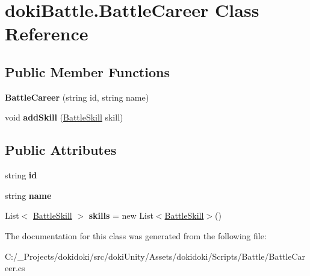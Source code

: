 \hypertarget{classdoki_battle_1_1_battle_career}{}\section{doki\+Battle.\+Battle\+Career Class Reference}
\label{classdoki_battle_1_1_battle_career}
\subsection*{Public Member Functions}
\begin{DoxyCompactItemize}
\item 
{\bfseries Battle\+Career} (string id, string name)\hypertarget{classdoki_battle_1_1_battle_career_ade1133fa150540583472805da3423cb4}{}\label{classdoki_battle_1_1_battle_career_ade1133fa150540583472805da3423cb4}

\item 
void {\bfseries add\+Skill} (\hyperlink{classdoki_battle_1_1_battle_skill}{Battle\+Skill} skill)\hypertarget{classdoki_battle_1_1_battle_career_a93b45e6612e9cf9e176047d6914544b8}{}\label{classdoki_battle_1_1_battle_career_a93b45e6612e9cf9e176047d6914544b8}

\end{DoxyCompactItemize}
\subsection*{Public Attributes}
\begin{DoxyCompactItemize}
\item 
string {\bfseries id}\hypertarget{classdoki_battle_1_1_battle_career_a64d97356082512e2505eaf516063e0bd}{}\label{classdoki_battle_1_1_battle_career_a64d97356082512e2505eaf516063e0bd}

\item 
string {\bfseries name}\hypertarget{classdoki_battle_1_1_battle_career_aca7878fe9f8536b51debf3f59a2248f4}{}\label{classdoki_battle_1_1_battle_career_aca7878fe9f8536b51debf3f59a2248f4}

\item 
List$<$ \hyperlink{classdoki_battle_1_1_battle_skill}{Battle\+Skill} $>$ {\bfseries skills} = new List$<$\hyperlink{classdoki_battle_1_1_battle_skill}{Battle\+Skill}$>$()\hypertarget{classdoki_battle_1_1_battle_career_a2dad42e17322506fa8607948caa3612b}{}\label{classdoki_battle_1_1_battle_career_a2dad42e17322506fa8607948caa3612b}

\end{DoxyCompactItemize}


The documentation for this class was generated from the following file\+:\begin{DoxyCompactItemize}
\item 
C\+:/\+\_\+\+Projects/dokidoki/src/doki\+Unity/\+Assets/dokidoki/\+Scripts/\+Battle/Battle\+Career.\+cs\end{DoxyCompactItemize}
